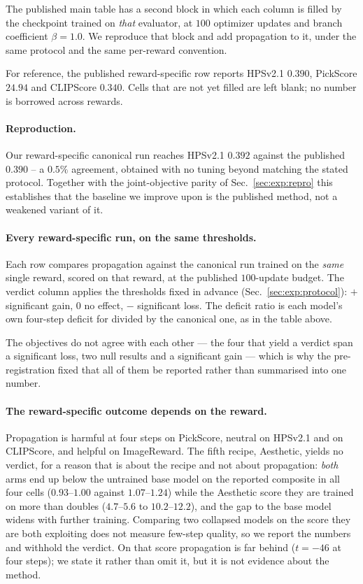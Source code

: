 The published main table has a second block in which each column is filled by the
checkpoint trained on \emph{that} evaluator, at $100$ optimizer updates and branch
coefficient $\beta=1.0$. We reproduce that block and add propagation to it, under the same
protocol and the same per-reward convention.



For reference, the published reward-specific row reports HPSv2.1 $0.390$, PickScore
$24.94$ and CLIPScore $0.340$. Cells that are not yet filled are left blank; no number is
borrowed across rewards.

\paragraph{Reproduction.}
Our reward-specific canonical run reaches HPSv2.1 $0.392$ against the published $0.390$ --
a $0.5\%$ agreement, obtained with no tuning beyond matching the stated protocol. Together
with the joint-objective parity of Sec.~\ref{sec:exp:repro} this establishes that the
baseline we improve upon is the published method, not a weakened variant of it.

\paragraph{Every reward-specific run, on the same thresholds.}
Each row compares propagation against the canonical run trained on the \emph{same} single
reward, scored on that reward, at the published $100$-update budget. The verdict column
applies the thresholds fixed in advance (Sec.~\ref{sec:exp:protocol}): $+$ significant gain,
$0$ no effect, $-$ significant loss. The deficit ratio is each model's own four-step deficit
for \MSP divided by the canonical one, as in the table above.



The objectives do not agree with each other --- the four that yield a verdict span a
significant loss, two null results and a significant gain --- which is why the
pre-registration fixed that all of them be reported rather than summarised into one
number.

\paragraph{The reward-specific outcome depends on the reward.}
Propagation is harmful at four steps on PickScore, neutral on HPSv2.1 and on CLIPScore, and
helpful on ImageReward. The fifth recipe, Aesthetic, yields no verdict, for a reason that is
about the recipe and not about propagation: \emph{both} arms end up below the untrained base
model on the reported composite in all four cells ($0.93$--$1.00$ against $1.07$--$1.24$) while
the Aesthetic score they are trained on more than doubles ($4.7$--$5.6$ to $10.2$--$12.2$), and
the gap to the base model widens with further training. Comparing two collapsed models on the
score they are both exploiting does not measure few-step quality, so we report the numbers and
withhold the verdict. On that score propagation is far behind ($t=-46$ at four steps); we state
it rather than omit it, but it is not evidence about the method.

